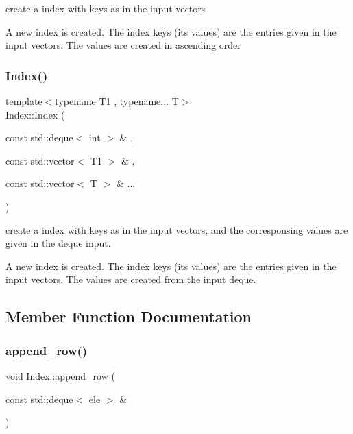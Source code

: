 create a index with keys as in the input vectors 

A new index is created. The index keys (its values) are the entries given in the input vectors. The values are created in ascending order \mbox{\label{classIndex_adc750ff9ab90e7fac9d411d1ebea4c86}} 
\subsubsection{\texorpdfstring{Index()}{Index()}\hspace{0.1cm}{\footnotesize\ttfamily [2/2]}}
{\footnotesize\ttfamily template$<$typename T1 , typename... T$>$ \\
Index\+::\+Index (\begin{DoxyParamCaption}\item[{const std\+::deque$<$ int $>$ \&}]{,  }\item[{const std\+::vector$<$ T1 $>$ \&}]{,  }\item[{const std\+::vector$<$ T $>$ \&}]{... }\end{DoxyParamCaption})}



create a index with keys as in the input vectors, and the corresponsing values are given in the deque input. 

A new index is created. The index keys (its values) are the entries given in the input vectors. The values are created from the input deque. 

\subsection{Member Function Documentation}
\mbox{\label{classIndex_ac3789b237b8cebc11d67e255cb25d6c6}} 
\subsubsection{\texorpdfstring{append\+\_\+row()}{append\_row()}}
{\footnotesize\ttfamily void Index\+::append\+\_\+row (\begin{DoxyParamCaption}\item[{const std\+::deque$<$ ele $>$ \&}]{ }\end{DoxyParamCaption})}

